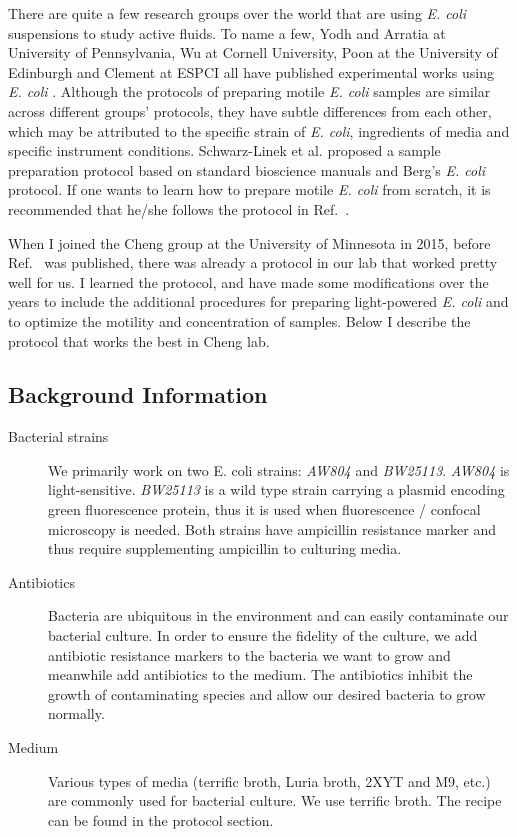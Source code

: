 There are quite a few research groups over the world that are using \textit{E. coli} suspensions to study active fluids. To name a few, Yodh and Arratia at University of Pennsylvania, Wu at Cornell University, Poon at the University of Edinburgh and Clement at ESPCI all have published experimental works using \textit{E. coli} \cite{Chen2007, Patteson2016, Kasyap2014, Jepson2013, Mino2011}. Although the protocols of preparing motile \textit{E. coli} samples are similar across different groups' protocols, they have subtle differences from each other, which may be attributed to the specific strain of \textit{E. coli}, ingredients of media and specific instrument conditions. Schwarz-Linek et al. proposed a sample preparation protocol based on standard bioscience manuals \cite{Bonner2011}
and Berg's \textit{E. coli} protocol. If one wants to learn how to prepare motile \textit{E. coli} from scratch, it is recommended that he/she follows the protocol in Ref.~\cite{Schwarz-Linek2016}.

When I joined the Cheng group at the University of Minnesota in 2015, before Ref.~\cite{Schwarz-Linek2016} was published, there was already a protocol in our lab that worked pretty well for us. I learned the protocol, and have made some modifications over the years to include the additional procedures for preparing light-powered \textit{E. coli} and to optimize the motility and concentration of samples. Below I describe the protocol that works the best in Cheng lab.

\subsection{Background Information}
\begin{description}
  \item [Bacterial strains] We primarily work on two E. coli strains: \textit{AW804} and \textit{BW25113}. \textit{AW804} is light-sensitive. \textit{BW25113} is a wild type strain carrying a plasmid encoding green fluorescence protein, thus it is used when fluorescence / confocal microscopy is needed. Both strains have ampicillin resistance marker and thus require supplementing ampicillin to culturing media.
  \item [Antibiotics] Bacteria are ubiquitous in the environment and can easily  contaminate our bacterial culture. In order to ensure the fidelity of the culture, we add antibiotic resistance markers to the bacteria we want to grow and meanwhile add antibiotics to the medium. The antibiotics inhibit the growth of contaminating species and allow our desired bacteria to grow normally.
  \item [Medium] Various types of media (terrific broth, Luria broth, 2XYT and M9, etc.) are commonly used for bacterial culture. We use terrific broth. The recipe can be found in the protocol section.
\end{description}

